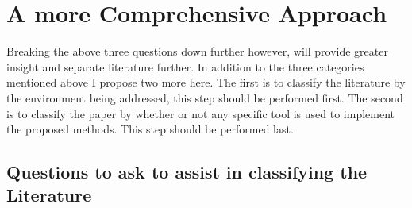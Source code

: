 \section{A more Comprehensive Approach}
Breaking the above three questions down further however, will provide greater insight and separate literature further.  
In addition to the three categories mentioned above  I propose two more here. 
The first is to classify the literature by the environment being addressed,  this step should be performed first. 
The second is to classify the paper by whether or not any specific tool is used to implement the proposed methods. 
This step should be performed last.

\subsection{Questions to ask to assist in classifying the Literature}

